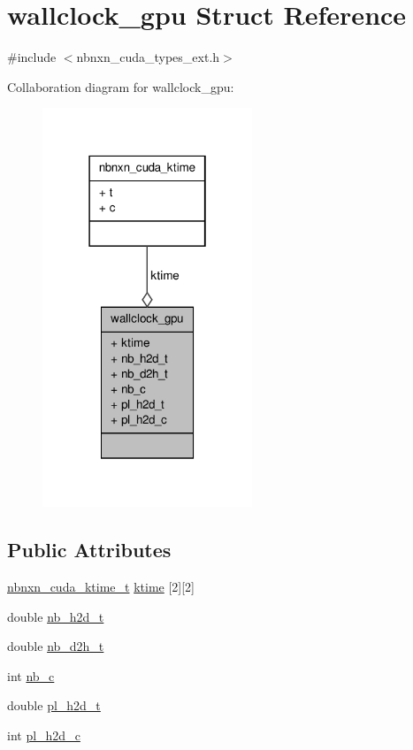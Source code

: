 \hypertarget{structwallclock__gpu}{\section{wallclock\-\_\-gpu \-Struct \-Reference}
\label{structwallclock__gpu}
}


{\ttfamily \#include $<$nbnxn\-\_\-cuda\-\_\-types\-\_\-ext.\-h$>$}



\-Collaboration diagram for wallclock\-\_\-gpu\-:
\nopagebreak
\begin{figure}[H]
\begin{center}
\leavevmode
\includegraphics[width=178pt]{structwallclock__gpu__coll__graph}
\end{center}
\end{figure}
\subsection*{\-Public \-Attributes}
\begin{DoxyCompactItemize}
\item 
\hyperlink{include_2types_2nbnxn__cuda__types__ext_8h_af67c5b1ac1a101c0220eb06779de2d59}{nbnxn\-\_\-cuda\-\_\-ktime\-\_\-t} \hyperlink{structwallclock__gpu_aa0ae471b048a39906bad3440ef555e41}{ktime} \mbox{[}2\mbox{]}\mbox{[}2\mbox{]}
\item 
double \hyperlink{structwallclock__gpu_ac1b185e220b1736104990a4eb0d0313f}{nb\-\_\-h2d\-\_\-t}
\item 
double \hyperlink{structwallclock__gpu_aae666935ce8299498ce900bded56cc80}{nb\-\_\-d2h\-\_\-t}
\item 
int \hyperlink{structwallclock__gpu_af068feb55d4df32d5501adf05d71a5e8}{nb\-\_\-c}
\item 
double \hyperlink{structwallclock__gpu_a8fd837503cc4bb25d0ef1c65ba517744}{pl\-\_\-h2d\-\_\-t}
\item 
int \hyperlink{structwallclock__gpu_a6c9818ea604290695cbc30e4c80b808b}{pl\-\_\-h2d\-\_\-c}
\end{DoxyCompactItemize}


